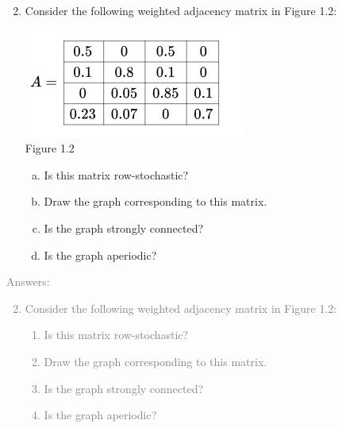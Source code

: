 \documentclass[11pt]{article}
\begin{document}
\begin{enumerate}
	\setcounter{enumi}{1}
	\item Consider the following weighted adjacency matrix in Figure 1.2:
	\begin{center}
		\includegraphics[scale=0.6]{Question2_Figure1.2}\\
		Figure 1.2
	\end{center}
	\begin{enumerate}[(a)]
		\item Is this matrix row-stochastic?
		\item Draw the graph corresponding to this matrix.
		\item Is the graph strongly connected?
		\item Is the graph aperiodic?
	\end{enumerate}
\end{enumerate}
\textcolor{gray}{
Answers:
\begin{enumerate}
	\setcounter{enumi}{1}
	\item Consider the following weighted adjacency matrix in Figure 1.2:
	\begin{enumerate}[a]
			\item Is this matrix row-stochastic?
			\item Draw the graph corresponding to this matrix.
			\item Is the graph strongly connected?
			\item Is the graph aperiodic?
	\end{enumerate}
\end{enumerate}
}
\end{document}
